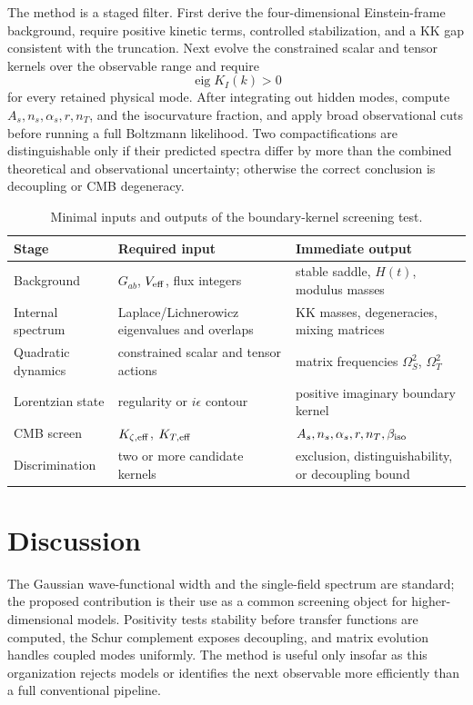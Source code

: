 \documentclass[aps,prd,twocolumn,superscriptaddress,nofootinbib,longbibliography,floatfix]{revtex4-2}
\begin{document}
The method is a staged filter. First derive the four-dimensional Einstein-frame background, require positive kinetic terms, controlled stabilization, and a KK gap consistent with the truncation. Next evolve the constrained scalar and tensor kernels over the observable range and require
\begin{equation}
\operatorname{eig}K_I(k)>0
\end{equation}
for every retained physical mode. After integrating out hidden modes, compute $A_s,n_s,\alpha_s,r,n_T$, and the isocurvature fraction, and apply broad observational cuts before running a full Boltzmann likelihood. Two compactifications are distinguishable only if their predicted spectra differ by more than the combined theoretical and observational uncertainty; otherwise the correct conclusion is decoupling or CMB degeneracy.

\begin{table}[tbp]
\caption{Minimal inputs and outputs of the boundary-kernel screening test.}
\begin{ruledtabular}
\begin{tabular}{lll}
Stage & Required input & Immediate output\\
\hline
Background & $G_{ab}$, $V_{\rm eff}$, flux integers & stable saddle, $H(t)$, modulus masses\\
Internal spectrum & Laplace/Lichnerowicz eigenvalues and overlaps & KK masses, degeneracies, mixing matrices\\
Quadratic dynamics & constrained scalar and tensor actions & matrix frequencies $\Omega_S^2$, $\Omega_T^2$\\
Lorentzian state & regularity or $i\epsilon$ contour & positive imaginary boundary kernel\\
CMB screen & $K_{\zeta,\rm eff}$, $K_{T,\rm eff}$ & $A_s,n_s,\alpha_s,r,n_T,\beta_{\rm iso}$\\
Discrimination & two or more candidate kernels & exclusion, distinguishability, or decoupling bound\\
\end{tabular}
\end{ruledtabular}
\end{table}

\section{Discussion}
\label{sec:discussion}

The Gaussian wave-functional width and the single-field spectrum are standard; the proposed contribution is their use as a common screening object for higher-dimensional models. Positivity tests stability before transfer functions are computed, the Schur complement exposes decoupling, and matrix evolution handles coupled modes uniformly. The method is useful only insofar as this organization rejects models or identifies the next observable more efficiently than a full conventional pipeline.
\end{document}
